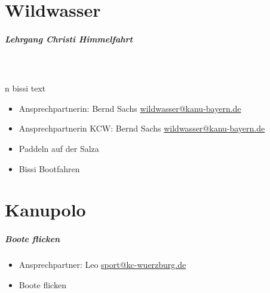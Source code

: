 \documentclass[12pt, a4paper]{report}
\begin{document}
\chapter*{Wildwasser}
\thispagestyle{Wildwasser}
\pagestyle{Wildwasser}
\paragraph{Lehrgang Christi Himmelfahrt}
\mbox{}\\\mbox{}\\n bissi text\\\begin{itemize}
    \item Ansprechpartnerin: Bernd Sachs \href{mailto:wildwasser@kanu-bayern.de}{wildwasser@kanu-bayern.de}
    \item Ansprechpartnerin KCW: Bernd Sachs \href{mailto:wildwasser@kanu-bayern.de}{wildwasser@kanu-bayern.de}
    \item Paddeln auf der Salza
    \item Bissi Bootfahren
\end{itemize}


\chapter*{Kanupolo}
\thispagestyle{Kanupolo}
\pagestyle{Kanupolo}
\paragraph{Boote flicken}
\begin{itemize}
    \item Ansprechpartner: Leo \href{mailto:sport@kc-wuerzburg.de}{sport@kc-wuerzburg.de}
    \item Boote flicken
\end{itemize}
\end{document}
